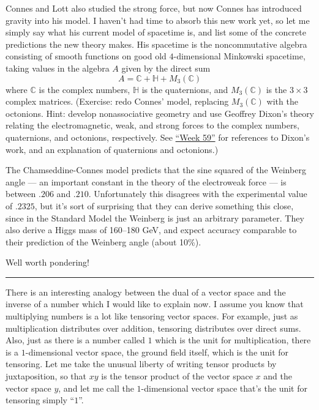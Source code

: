 \documentclass{article}
\begin{document}
Connes and Lott also studied the strong force, but now Connes has
introduced gravity into his model. I haven't had time to absorb this new
work yet, so let me simply say what his current model of spacetime is,
and list some of the concrete predictions the new theory makes. His
spacetime is the noncommutative algebra consisting of smooth functions
on good old \(4\)-dimensional Minkowski spacetime, taking values in the
algebra \(A\) given by the direct sum
\[A = \mathbb{C} + \mathbb{H} + M_3(\mathbb{C})\] where \(\mathbb{C}\)
is the complex numbers, \(\mathbb{H}\) is the quaternions, and
\(M_3(\mathbb{C})\) is the \(3\times3\) complex matrices. (Exercise:
redo Connes' model, replacing \(M_3(\mathbb{C})\) with the octonions.
Hint: develop nonassociative geometry and use Geoffrey Dixon's theory
relating the electromagnetic, weak, and strong forces to the complex
numbers, quaternions, and octonions, respectively. See
\protect\hyperlink{week59}{``Week 59''} for references to Dixon's work,
and an explanation of quaternions and octonions.)

The Chamseddine-Connes model predicts that the sine squared of the
Weinberg angle --- an important constant in the theory of the
electroweak force --- is between \(.206\) and \(.210\). Unfortunately
this disagrees with the experimental value of \(.2325\), but it's sort
of surprising that they can derive something this close, since in the
Standard Model the Weinberg is just an arbitrary parameter. They also
derive a Higgs mass of 160--180 GeV, and expect accuracy comparable to
their prediction of the Weinberg angle (about 10\%).

Well worth pondering!

\begin{center}\rule{0.5\linewidth}{0.5pt}\end{center}

There is an interesting analogy between the dual of a vector space and
the inverse of a number which I would like to explain now. I assume you
know that multiplying numbers is a lot like tensoring vector spaces. For
example, just as multiplication distributes over addition, tensoring
distributes over direct sums. Also, just as there is a number called
\(1\) which is the unit for multiplication, there is a \(1\)-dimensional
vector space, the ground field itself, which is the unit for tensoring.
Let me take the unusual liberty of writing tensor products by
juxtaposition, so that \(xy\) is the tensor product of the vector space
\(x\) and the vector space \(y\), and let me call the \(1\)-dimensional
vector space that's the unit for tensoring simply ``\(1\)''.
\end{document}
